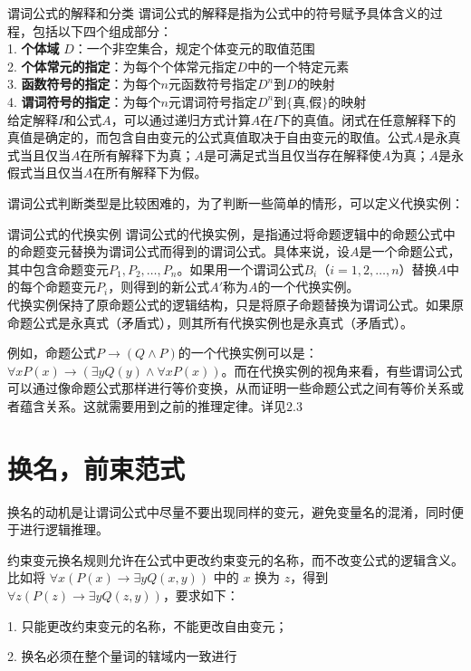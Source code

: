 \begin{definition}{谓词公式的解释和分类}{}
谓词公式的解释是指为公式中的符号赋予具体含义的过程，包括以下四个组成部分：\\
1. \textbf{个体域} $D$：一个非空集合，规定个体变元的取值范围\\
2. \textbf{个体常元的指定}：为每个个体常元指定$D$中的一个特定元素\\
3. \textbf{函数符号的指定}：为每个$n$元函数符号指定$D^n$到$D$的映射\\
4. \textbf{谓词符号的指定}：为每个$n$元谓词符号指定$D^n$到$\{\text{真,假}\}$的映射\\
给定解释$I$和公式$A$，可以通过递归方式计算$A$在$I$下的真值。闭式在任意解释下的真值是确定的，而包含自由变元的公式真值取决于自由变元的取值。公式$A$是永真式当且仅当$A$在所有解释下为真；$A$是可满足式当且仅当存在解释使$A$为真；$A$是永假式当且仅当$A$在所有解释下为假。
\end{definition}
谓词公式判断类型是比较困难的，为了判断一些简单的情形，可以定义代换实例：
\begin{definition}{谓词公式的代换实例}{}
谓词公式的代换实例，是指通过将命题逻辑中的命题公式中的命题变元替换为谓词公式而得到的谓词公式。具体来说，设$A$是一个命题公式，其中包含命题变元$P_1, P_2, \ldots, P_n$。如果用一个谓词公式$B_i$（$i = 1, 2, \ldots, n$）替换$A$中的每个命题变元$P_i$，则得到的新公式$A'$称为$A$的一个代换实例。\\
代换实例保持了原命题公式的逻辑结构，只是将原子命题替换为谓词公式。如果原命题公式是永真式（矛盾式），则其所有代换实例也是永真式（矛盾式）。
\end{definition}
例如，命题公式$P \rightarrow (Q \land P)$的一个代换实例可以是：$\forall x P(x) \rightarrow (\exists y Q(y) \land \forall x P(x))$。而在代换实例的视角来看，有些谓词公式可以通过像命题公式那样进行等价变换，从而证明一些命题公式之间有等价关系或者蕴含关系。这就需要用到之前的推理定律。详见$2.3$
\section{换名，前束范式}
换名的动机是让谓词公式中尽量不要出现同样的变元，避免变量名的混淆，同时便于进行逻辑推理。

约束变元换名规则允许在公式中更改约束变元的名称，而不改变公式的逻辑含义。比如将 $\forall x (P(x) \rightarrow \exists y Q(x,y))$ 中的 $x$ 换为 $z$，得到 $\forall z (P(z) \rightarrow \exists y Q(z,y))$，要求如下：

1. 只能更改约束变元的名称，不能更改自由变元；

2. 换名必须在整个量词的辖域内一致进行

